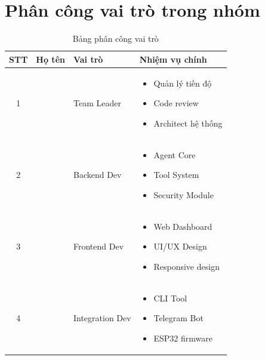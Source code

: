 \documentclass[12pt,a4paper]{article}
\begin{document}
\section{Phân công vai trò trong nhóm}

\begin{table}[H]
    \centering
    \begin{tabular}{|c|l|l|p{5cm}|}
        \hline
        \textbf{STT} & \textbf{Họ tên} & \textbf{Vai trò} & \textbf{Nhiệm vụ chính} \\
        \hline
        1 & \underline{\hspace{3cm}} & Team Leader & 
        \begin{itemize}[leftmargin=*, nosep]
            \item Quản lý tiến độ
            \item Code review
            \item Architect hệ thống
        \end{itemize} \\
        \hline
        2 & \underline{\hspace{3cm}} & Backend Dev & 
        \begin{itemize}[leftmargin=*, nosep]
            \item Agent Core
            \item Tool System
            \item Security Module
        \end{itemize} \\
        \hline
        3 & \underline{\hspace{3cm}} & Frontend Dev & 
        \begin{itemize}[leftmargin=*, nosep]
            \item Web Dashboard
            \item UI/UX Design
            \item Responsive design
        \end{itemize} \\
        \hline
        4 & \underline{\hspace{3cm}} & Integration Dev & 
        \begin{itemize}[leftmargin=*, nosep]
            \item CLI Tool
            \item Telegram Bot
            \item ESP32 firmware
        \end{itemize} \\
        \hline
    \end{tabular}
    \caption{Bảng phân công vai trò}
\end{table}
\end{document}
